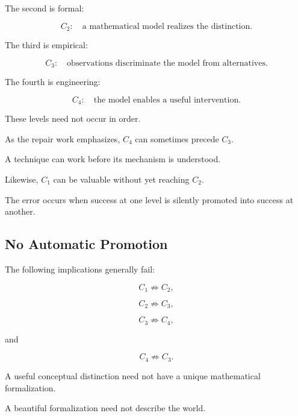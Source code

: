\documentclass[11pt]{article}
\theoremstyle{remark}
\begin{document}
The second is formal:

\begin{equation}
C_2:
\quad
\text{a mathematical model realizes the distinction}.
\end{equation}

The third is empirical:

\begin{equation}
C_3:
\quad
\text{observations discriminate the model from alternatives}.
\end{equation}

The fourth is engineering:

\begin{equation}
C_4:
\quad
\text{the model enables a useful intervention}.
\end{equation}

These levels need not occur in order.

As the repair work emphasizes, $C_4$ can sometimes precede $C_3$.

A technique can work before its mechanism is understood.

Likewise, $C_1$ can be valuable without yet reaching $C_2$.

The error occurs when success at one level is silently promoted into success at another.

\subsection{No Automatic Promotion}

The following implications generally fail:

\begin{equation}
C_1\not\Rightarrow C_2,
\end{equation}

\begin{equation}
C_2\not\Rightarrow C_3,
\end{equation}

\begin{equation}
C_3\not\Rightarrow C_4,
\end{equation}

and

\begin{equation}
C_4\not\Rightarrow C_3.
\end{equation}

A useful conceptual distinction need not have a unique mathematical formalization.

A beautiful formalization need not describe the world.
\end{document}
